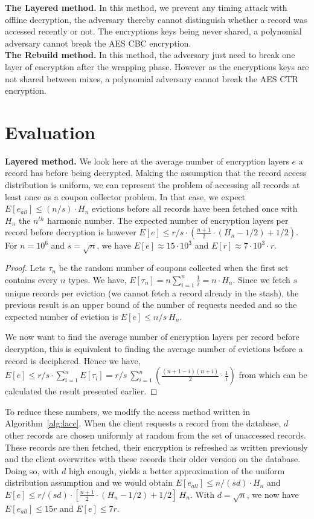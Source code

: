 \documentclass[USenglish,oneside,twocolumn]{article}
\begin{document}
\noindent\textbf{The Layered method.}
In this method, we prevent any timing attack with offline decryption, the adversary thereby cannot distinguish whether a record was accessed recently or not. The encryptions keys being never shared, a polynomial adversary cannot break the AES CBC encryption.\\

\noindent\textbf{The Rebuild method.}
In this method, the adversary just need to break one layer of encryption after the wrapping phase. However as the encryptions keys are not shared between mixes, a polynomial adversary cannot break the AES CTR encryption.

\section{Evaluation}\label{Evaluation}
\textbf{Layered method.} We look here at the average number of encryption layers $e$ a record has before being decrypted. Making the assumption that the record access distribution is uniform, we can represent the problem of accessing all records at least once as a coupon collector problem. In that case, we expect $E[e_{all}]\leq(n/s)\cdot H_n$ evictions before all records have been fetched once with $H_n$ the $n^{th}$ harmonic number. The expected number of encryption layers per record before decryption is however $E[e]\leq{r/s} \cdot \left ( \frac{n+1}{2}\cdot(H_n-1/2)+1/2 \right )$. For $n=10^6$ and $s=\sqrt{n}$, we have $E[e]\approx 15 \cdot 10^3$ and $E[r]\approx 7\cdot 10^3 \cdot r$.
\begin{proof}
Lets $\tau_n$ be the random number of coupons collected when the first set contains every $n$ types. We have, $E[\tau_n]=n\sum_{i=1}^n \frac{1}{i} = n \cdot H_n$.
Since we fetch $s$ unique records per eviction (we cannot fetch a record already in the stash), the previous result is an upper bound of the number of requests needed and so the expected number of eviction is $E[e]\leq n/s\ H_n$.

We now want to find the average number of encryption layers per record before decryption, this is equivalent to finding the average number of evictions before a record is deciphered. 
Hence we have, $E[e]\leq r/s \cdot \sum_{i=1}^n E[\tau_i] = r/s\ \sum_{i=1}^n \left (\frac{(n+1-i)(n+i)}{2}\cdot \frac{1}{i}\right )$ from which can be calculated the result presented earlier. 
\end{proof}

To reduce these numbers, we modify the access method written in Algorithm~\ref{alg:lacc}. When the client requests a record from the database, $d$ other records are chosen uniformly at random from the set of unaccessed records. These records are then fetched, their encryption is refreshed as written previously and the client overwrites with these records their older version on the database. Doing so, with $d$ high enough, yields a better approximation of the uniform distribution assumption and we would obtain  $E[e_{all}]\leq n/(sd) \cdot H_n $ and $E[e] \leq {r/(sd)} \cdot \left [ \frac{n+1}{2}\cdot(H_n-1/2)+1/2 \right ] \ H_n$.
With $d=\sqrt n$, we now have $E[e_{all}]\leq 15 r$ and $E[e]\leq 7r$.
\end{document}
